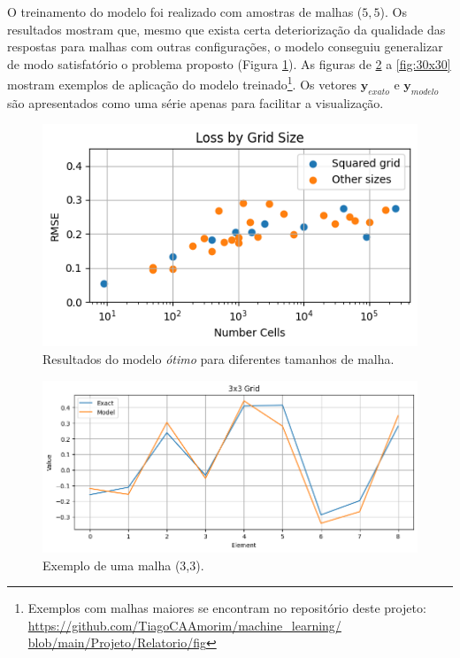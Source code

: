 \documentclass[final,5p]{elsarticle}
\numberwithin{equation}{section}
\begin{document}
    O treinamento do modelo foi realizado com amostras de malhas ($5,5$). Os resultados mostram que, mesmo que exista certa deteriorização da qualidade das respostas para malhas com outras configurações, o modelo conseguiu generalizar de modo satisfatório o problema proposto (Figura \ref{fig:rmse}). As figuras de \ref{fig:3x3} a \ref{fig:30x30} mostram exemplos de aplicação do modelo treinado\footnote{Exemplos com malhas maiores se encontram no repositório deste projeto: \href{https://github.com/TiagoCAAmorim/machine_learning/blob/main/Projeto/Relatorio/fig}{https://github.com/TiagoCAAmorim/machine\_learning/ blob/main/Projeto/Relatorio/fig}}. Os vetores $\textbf{y}_{exato}$ e $\textbf{y}_{modelo}$ são apresentados como uma série apenas para facilitar a visualização.

    \begin{figure}[hbt!]
        \centering
        \includegraphics[width=0.85\columnwidth]{./fig/RMSE.png}
        \caption{Resultados do modelo \emph{ótimo} para diferentes tamanhos de malha.}\label{fig:rmse}
    \end{figure}

    \begin{figure}[hbt!]
        \centering
        \includegraphics[width=0.85\columnwidth]{./fig/3x3.png}
        \caption{Exemplo de uma malha ($3$,$3$).}\label{fig:3x3}
    \end{figure}
\end{document}
